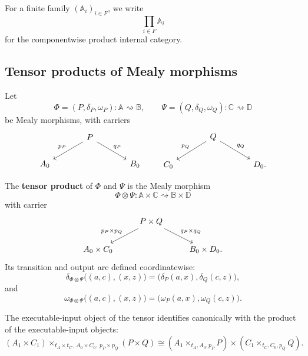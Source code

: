 For a finite family \((\mathbb A_i)_{i\in F}\), we write
\[
    \prod_{i\in F}\mathbb A_i
\]
for the componentwise product internal category.

\subsection{Tensor products of Mealy morphisms}
\label{subsec:cmett-tensor-products-mealy}

Let
\[
    \Phi=(P,\delta_P,\omega_P):\mathbb A\rightsquigarrow\mathbb B,
    \qquad
    \Psi=(Q,\delta_Q,\omega_Q):\mathbb C\rightsquigarrow\mathbb D
\]
be Mealy morphisms, with carriers
\[
\begin{tikzcd}[column sep=large]
&
P
    \arrow[dl,"p_P"']
    \arrow[dr,"q_P"]
&
\\
A_0
&&
B_0
\end{tikzcd}
\qquad
\begin{tikzcd}[column sep=large]
&
Q
    \arrow[dl,"p_Q"']
    \arrow[dr,"q_Q"]
&
\\
C_0
&&
D_0 .
\end{tikzcd}
\]

\begin{definition}
\label{def:cmett-tensor-product-mealy}
    The \textbf{tensor product} of \(\Phi\) and \(\Psi\) is the Mealy
    morphism
    \[
        \Phi\otimes\Psi:
        \mathbb A\times\mathbb C
        \rightsquigarrow
        \mathbb B\times\mathbb D
    \]
    with carrier
    \[
    \begin{tikzcd}
    &
    P\times Q
        \arrow[dl,"p_P\times p_Q"']
        \arrow[dr,"q_P\times q_Q"]
    &
    \\
    A_0\times C_0
    &&
    B_0\times D_0 .
    \end{tikzcd}
    \]
    Its transition and output are defined coordinatewise:
    \[
        \delta_{\Phi\otimes\Psi}\bigl((a,c),(x,z)\bigr)
        =
        \bigl(\delta_P(a,x),\delta_Q(c,z)\bigr),
    \]
    and
    \[
        \omega_{\Phi\otimes\Psi}\bigl((a,c),(x,z)\bigr)
        =
        \bigl(\omega_P(a,x),\omega_Q(c,z)\bigr).
    \]
\end{definition}

The executable-input object of the tensor identifies canonically with the
product of the executable-input objects:
\[
    (A_1\times C_1)
    \times_{t_A\times t_C,\ A_0\times C_0,\ p_P\times p_Q}
    (P\times Q)
    \cong
    (A_1\times_{t_A,A_0,p_P}P)
    \times
    (C_1\times_{t_C,C_0,p_Q}Q).
\]

